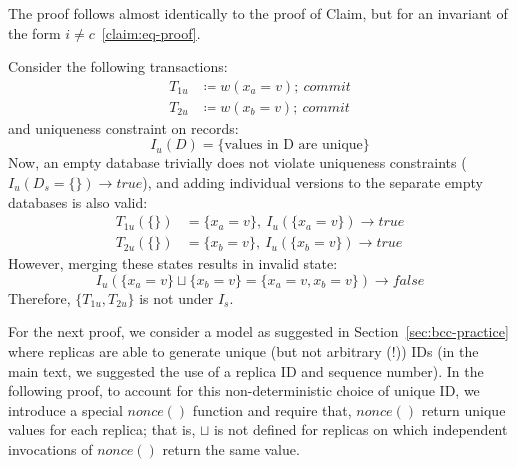 \begin{claim} \label{claim:neq} The proof follows almost identically to the proof of Claim, but for an invariant of the form $i\neq c$~\ref{claim:eq-proof}.  \end{claim}

\begin{claim}
\label{claim:sunique}
Consider the following transactions:
\begin{align*}
T_{1u}&\coloneqq w(x_a=v);~commit\\
T_{2u}&\coloneqq w(x_b=v);~commit
\end{align*}
and uniqueness constraint on records:
$$I_u(D) = \{\textrm{values in D are unique}\}$$
Now, an empty database trivially does not violate uniqueness constraints ($I_u(D_s=\{\})\rightarrow true$), and adding individual versions to the separate empty databases is also valid:
\begin{align*}
T_{1u}(\{\})&=\{x_a=v\},~I_u(\{x_a=v\}) \rightarrow true\\
T_{2u}(\{\})&=\{x_b=v\},~I_u(\{x_b=v\}) \rightarrow true
\end{align*}
However, merging these states results in invalid state:
$$I_u(\{x_a=v\}\sqcup \{x_b=v\} = \{x_a=v, x_b=v\}) \rightarrow false$$
Therefore, $\{T_{1u}, T_{2u}\}$ is not \iconfluent under $I_s$.
\end{claim} 

For the next proof, we consider a model as suggested in Section~\ref{sec:bcc-practice} where replicas are able to generate unique (but not arbitrary (!)) IDs (in the main text, we suggested the use of a replica ID and sequence number). In the following proof, to account for this non-deterministic choice of unique ID, we introduce a special $nonce()$ function and require that, $nonce()$ return unique values for each replica; that is, $\sqcup$ is not defined for replicas on which independent invocations of $nonce()$ return the same value.

